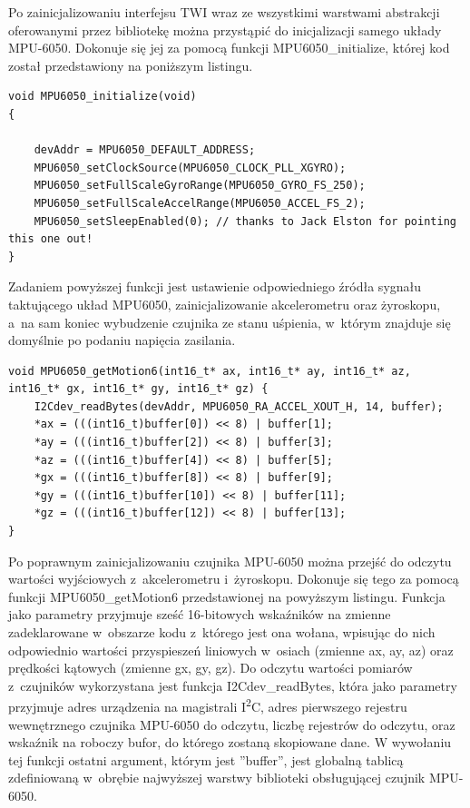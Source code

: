Po zainicjalizowaniu interfejsu TWI wraz ze wszystkimi warstwami abstrakcji oferowanymi przez bibliotekę można przystąpić do inicjalizacji samego układy MPU-6050. Dokonuje się jej za pomocą funkcji MPU6050\_initialize, której kod został przedstawiony na poniższym listingu.

\begin{lstlisting}
void MPU6050_initialize(void) 
{
	
	devAddr = MPU6050_DEFAULT_ADDRESS;
    MPU6050_setClockSource(MPU6050_CLOCK_PLL_XGYRO);
    MPU6050_setFullScaleGyroRange(MPU6050_GYRO_FS_250);
    MPU6050_setFullScaleAccelRange(MPU6050_ACCEL_FS_2);
    MPU6050_setSleepEnabled(0); // thanks to Jack Elston for pointing this one out!
}
\end{lstlisting}

Zadaniem powyższej funkcji jest ustawienie odpowiedniego źródła sygnału taktującego układ MPU6050, zainicjalizowanie akcelerometru oraz żyroskopu, a~na sam koniec wybudzenie czujnika ze stanu uśpienia, w~którym znajduje się domyślnie po podaniu napięcia zasilania.

\begin{lstlisting}
void MPU6050_getMotion6(int16_t* ax, int16_t* ay, int16_t* az, int16_t* gx, int16_t* gy, int16_t* gz) {
    I2Cdev_readBytes(devAddr, MPU6050_RA_ACCEL_XOUT_H, 14, buffer);
    *ax = (((int16_t)buffer[0]) << 8) | buffer[1];
    *ay = (((int16_t)buffer[2]) << 8) | buffer[3];
    *az = (((int16_t)buffer[4]) << 8) | buffer[5];
    *gx = (((int16_t)buffer[8]) << 8) | buffer[9];
    *gy = (((int16_t)buffer[10]) << 8) | buffer[11];
    *gz = (((int16_t)buffer[12]) << 8) | buffer[13];
}
\end{lstlisting}

Po poprawnym zainicjalizowaniu czujnika MPU-6050 można przejść do odczytu wartości wyjściowych z~akcelerometru i~żyroskopu. Dokonuje się tego za pomocą funkcji MPU6050\_getMotion6 przedstawionej na powyższym listingu. Funkcja jako parametry przyjmuje sześć 16-bitowych wskaźników na zmienne zadeklarowane w~obszarze kodu z~którego jest ona wołana, wpisując do nich odpowiednio wartości przyspieszeń liniowych w~osiach (zmienne ax, ay, az) oraz prędkości kątowych (zmienne gx, gy, gz). Do odczytu wartości pomiarów z~czujników wykorzystana jest funkcja I2Cdev\_readBytes, która jako parametry przyjmuje adres urządzenia na magistrali I\textsuperscript{2}C, adres pierwszego rejestru wewnętrznego czujnika MPU-6050 do odczytu, liczbę rejestrów do odczytu, oraz wskaźnik na roboczy bufor, do którego zostaną skopiowane dane. W wywołaniu tej funkcji ostatni argument, którym jest ''buffer'', jest globalną tablicą zdefiniowaną w~obrębie najwyższej warstwy biblioteki obsługującej czujnik MPU-6050.

